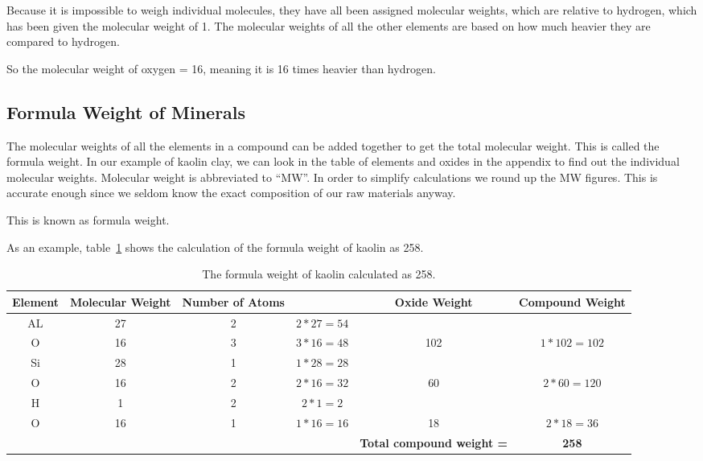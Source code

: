 Because it is impossible to weigh individual molecules, they have all been 
assigned molecular weights, which are relative to hydrogen, which has been 
given the molecular weight of 1. The molecular weights of all the other 
elements are based on how much heavier they are compared to hydrogen.

So the molecular weight of oxygen = 16, meaning it is 16 times heavier than 
hydrogen.
\subsection{Formula Weight of Minerals}
The molecular weights of all the elements in a compound can be added together 
to get the total molecular weight. This is called the formula weight. In our 
example of kaolin clay, we can look in the table of elements and oxides in the 
appendix to find out the individual molecular weights. Molecular weight is 
abbreviated to ``MW''. In order to simplify calculations we round up the MW 
figures. This is accurate enough since we seldom know the exact composition of 
our raw materials anyway.

This is known as formula weight.

As an example, table~\ref{tab:formulaweightkaolin} shows the calculation of 
the formula weight of kaolin as 258.
\begin{landscape}
\begin{center}
    \renewcommand{\arraystretch}{1.5}
\begin{table}
  \centering
  \begin{tabular}{|c|c|c|c|c|c|}\hline
\textbf{Element}&\textbf{Molecular Weight}&\textbf{Number of 
Atoms}&&\textbf{Oxide Weight}&\textbf{Compound Weight}\\\hline\hline
AL&27&2&$2*27=54$&&\\\hline
O&16&3&$3*16=48$&102&$1*102=102$\\\hline
Si&28&1&$1*28=28$&&\\\hline
O&16&2&$2*16=32$&60&$2*60=120$\\\hline
H&1&2&$2*1=2$&&\\\hline
O&16&1&$1*16=16$&18&$2*18=36$\\\hline\hline
&&&&\textbf{Total compound weight =}&\textbf{258}\\\hline
  \end{tabular}
\caption{The formula weight of kaolin calculated as 258.}
\label{tab:formulaweightkaolin}
\end{table}
\end{center}
\end{landscape}
